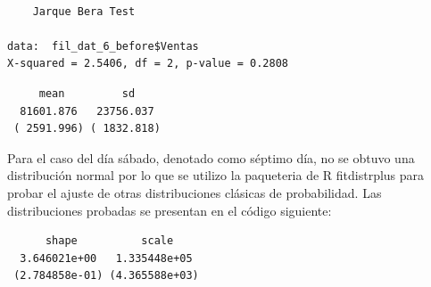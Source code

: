 \documentclass[
  us-letterpaper,
]{scrreprt}
\newenvironment{Shaded}{\begin{snugshade}}{\end{snugshade}}
\newcommand{\CommentTok}[1]{\textcolor[rgb]{0.37,0.37,0.37}{#1}}
\newcommand{\FunctionTok}[1]{\textcolor[rgb]{0.28,0.35,0.67}{#1}}
\newcommand{\NormalTok}[1]{\textcolor[rgb]{0.00,0.23,0.31}{#1}}
\newcommand{\SpecialCharTok}[1]{\textcolor[rgb]{0.37,0.37,0.37}{#1}}
\newcommand{\StringTok}[1]{\textcolor[rgb]{0.13,0.47,0.30}{#1}}
\theoremstyle{plain}
\theoremstyle{plain}
\theoremstyle{definition}
\theoremstyle{remark}
\begin{document}
\begin{verbatim}

    Jarque Bera Test

data:  fil_dat_6_before$Ventas
X-squared = 2.5406, df = 2, p-value = 0.2808
\end{verbatim}

\begin{Shaded}
\end{Shaded}

\begin{verbatim}
     mean         sd    
  81601.876   23756.037 
 ( 2591.996) ( 1832.818)
\end{verbatim}

Para el caso del día sábado, denotado como séptimo día, no se obtuvo una
distribución normal por lo que se utilizo la paqueteria de R
fitdistrplus para probar el ajuste de otras distribuciones clásicas de
probabilidad. Las distribuciones probadas se presentan en el código
siguiente:

\begin{Shaded}
\end{Shaded}

\begin{verbatim}
      shape          scale    
  3.646021e+00   1.335448e+05 
 (2.784858e-01) (4.365588e+03)
\end{verbatim}

\begin{Shaded}
\end{Shaded}
\end{document}
